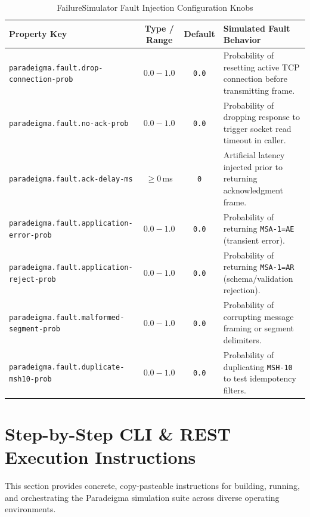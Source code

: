 \begin{table}[htbp]
\centering
\small
\begin{tabularx}{\textwidth}{l c c X}
\toprule
\textbf{Property Key} & \textbf{Type / Range} & \textbf{Default} & \textbf{Simulated Fault Behavior} \\
\midrule
\texttt{paradeigma.fault.drop-connection-prob} & $0.0 - 1.0$ & \texttt{0.0} & Probability of resetting active TCP connection before transmitting frame. \\
\texttt{paradeigma.fault.no-ack-prob} & $0.0 - 1.0$ & \texttt{0.0} & Probability of dropping response to trigger socket read timeout in caller. \\
\texttt{paradeigma.fault.ack-delay-ms} & $\ge 0$\,ms & \texttt{0} & Artificial latency injected prior to returning acknowledgment frame. \\
\texttt{paradeigma.fault.application-error-prob} & $0.0 - 1.0$ & \texttt{0.0} & Probability of returning \texttt{MSA-1=AE} (transient error). \\
\texttt{paradeigma.fault.application-reject-prob} & $0.0 - 1.0$ & \texttt{0.0} & Probability of returning \texttt{MSA-1=AR} (schema/validation rejection). \\
\texttt{paradeigma.fault.malformed-segment-prob} & $0.0 - 1.0$ & \texttt{0.0} & Probability of corrupting message framing or segment delimiters. \\
\texttt{paradeigma.fault.duplicate-msh10-prob} & $0.0 - 1.0$ & \texttt{0.0} & Probability of duplicating \texttt{MSH-10} to test idempotency filters. \\
\bottomrule
\end{tabularx}
\caption{FailureSimulator Fault Injection Configuration Knobs}
\label{tab:fault_injection_knobs}
\end{table}

\section{Step-by-Step CLI \& REST Execution Instructions}
\label{sec:paradeigma_execution_guide}

This section provides concrete, copy-pasteable instructions for building, running, and orchestrating the Paradeigma simulation suite across diverse operating environments.

